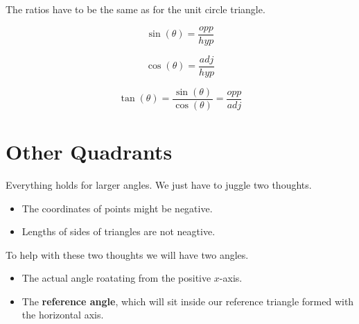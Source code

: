 \documentclass{ximera}
\begin{document}
\begin{image}[3in]
  \end{image}


The ratios have to be the same as for the unit circle triangle.


\[   \sin(\theta) = \frac{opp}{hyp}           \]



\[   \cos(\theta) = \frac{adj}{hyp}           \]




\[   \tan(\theta) = \frac{\sin(\theta)}{\cos(\theta)}    = \frac{opp}{adj}        \]








\section{Other Quadrants}


Everything holds for larger angles.  We just have to juggle two thoughts.  


\begin{itemize}
\item The coordinates of points might be negative.  
\item Lengths of sides of triangles are not neagtive.
\end{itemize}

To help with these two thoughts we will have two angles.  


\begin{itemize}
\item The actual angle roatating from the positive $x$-axis.  
\item The \textbf{reference angle}, which will sit inside our reference triangle formed with the horizontal axis.
\end{itemize}
\end{document}
